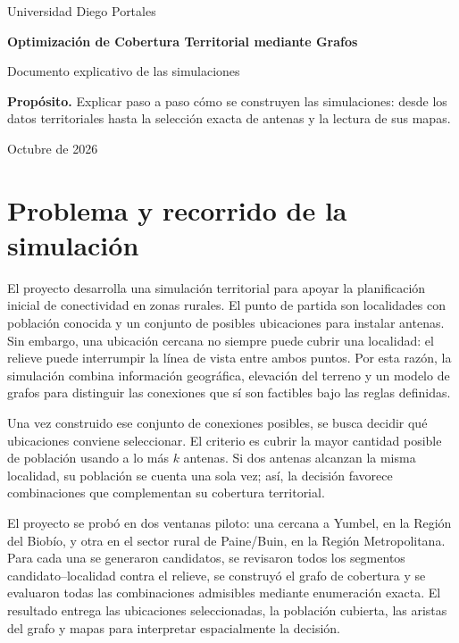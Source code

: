 \documentclass[11pt,a4paper]{article}
\begin{document}
\begin{titlepage}\centering\vspace*{38mm}
{\Large Universidad Diego Portales\par}\vspace{4mm}{\large Proyecto de Grafos y Algoritmos\par}\vspace{25mm}
{\LARGE\bfseries Optimización de Cobertura Territorial mediante Grafos\par}\vspace{8mm}
{\Large Documento explicativo de las simulaciones\par}\vfill
\begin{minipage}{.78\textwidth}\small\textbf{Propósito.} Explicar paso a paso cómo se construyen las simulaciones: desde los datos territoriales hasta la selección exacta de antenas y la lectura de sus mapas.\end{minipage}\vfill
{\large Octubre de 2026\par}\end{titlepage}

\section{Problema y recorrido de la simulación}
El proyecto desarrolla una simulación territorial para apoyar la planificación inicial de conectividad en zonas rurales. El punto de partida son localidades con población conocida y un conjunto de posibles ubicaciones para instalar antenas. Sin embargo, una ubicación cercana no siempre puede cubrir una localidad: el relieve puede interrumpir la línea de vista entre ambos puntos. Por esta razón, la simulación combina información geográfica, elevación del terreno y un modelo de grafos para distinguir las conexiones que sí son factibles bajo las reglas definidas.

Una vez construido ese conjunto de conexiones posibles, se busca decidir qué ubicaciones conviene seleccionar. El criterio es cubrir la mayor cantidad posible de población usando a lo más $k$ antenas. Si dos antenas alcanzan la misma localidad, su población se cuenta una sola vez; así, la decisión favorece combinaciones que complementan su cobertura territorial.

El proyecto se probó en dos ventanas piloto: una cercana a Yumbel, en la Región del Biobío, y otra en el sector rural de Paine/Buin, en la Región Metropolitana. Para cada una se generaron candidatos, se revisaron todos los segmentos candidato--localidad contra el relieve, se construyó el grafo de cobertura y se evaluaron todas las combinaciones admisibles mediante enumeración exacta. El resultado entrega las ubicaciones seleccionadas, la población cubierta, las aristas del grafo y mapas para interpretar espacialmente la decisión.
\end{document}
